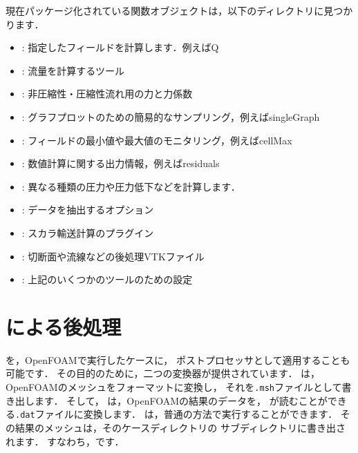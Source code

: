 現在パッケージ化されている関数オブジェクトは，以下のディレクトリに見つかります．
\begin{itemize}
 \item {}: 指定したフィールドを計算します．例えばQ
 \item {}: 流量を計算するツール
 \item {}: 非圧縮性・圧縮性流れ用の力と力係数
 \item {}: グラフプロットのための簡易的なサンプリング，例えばsingleGraph
 \item {}: フィールドの最小値や最大値のモニタリング，例えばcellMax
 \item {}: 数値計算に関する出力情報，例えばresiduals
 \item {}: 異なる種類の圧力や圧力低下などを計算します．
 \item {}: データを抽出するオプション
 \item {}: スカラ輸送計算のプラグイン
 \item {}: 切断面や流線などの後処理VTKファイル
 \item {}: 上記のいくつかのツールのための設定
\end{itemize}



\section{による後処理}
\label{sec:6.2}
を，OpenFOAMで実行したケースに，
ポストプロセッサとして適用することも可能です．
その目的のために，二つの変換器が提供されています．
%
%
は，
OpenFOAMのメッシュをフォーマットに変換し，
それを\texttt{.msh}ファイルとして書き出します．
そして，
%
%
は，OpenFOAMの結果のデータを，
が読むことができる\texttt{.dat}ファイルに変換します．
は，普通の方法で実行することができます．
その結果のメッシュは，そのケースディレクトリの
%
%
サブディレクトリに書き出されます．
すなわち，です．

